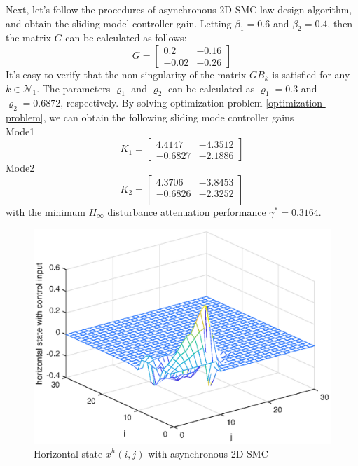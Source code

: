\documentclass[journal,final,twocolumn]{IEEEtran}
\begin{document}
Next, let's follow the procedures of asynchronous 2D-SMC law design algorithm, and obtain the sliding model controller gain. 
Letting $\beta_{1}=0.6$ and $\beta_{2}=0.4$, then the  matrix $G$ can be calculated as follows:
\begin{equation*}
G=\begin{bmatrix}
0.2&-0.16\\
-0.02&-0.26
\end{bmatrix}
\end{equation*}
It's easy to verify that the non-singularity of the matrix $GB_{k}$ is satisfied for any $k\in\mathcal{N}_{1}$. The parameters $\varrho_{1}$ and $\varrho_{2}$ can be calculated as $\varrho_{1}=0.3$ and $\varrho_{2}=0.6872$, respectively. By solving optimization problem \eqref{optimization-problem}, we can obtain the following sliding mode controller gains\\
Mode1
\begin{equation*}
 	K_{1}=\begin{bmatrix}
 	4.4147  & -4.3512\\
 	-0.6827 &  -2.1886
 	\end{bmatrix}
\end{equation*}
Mode2
\begin{equation*}
K_{2} = 	\begin{bmatrix}
 4.3706  & -3.8453 \\
-0.6826 &  -2.3252 \\
\end{bmatrix}
\end{equation*}
with the minimum $H_{\infty}$ disturbance attenuation performance $\gamma^{*}=0.3164$. 
\begin{figure}[!htb]
	\centering\includegraphics[scale=0.6]{./simulations/h-state-with-force.eps}
	\caption{Horizontal state $x^{h}(i,j)$ with  asynchronous 2D-SMC}
	\label{fig5}
\end{figure}
\end{document}
